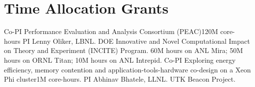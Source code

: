 \section{Time Allocation Grants}
		{Co-PI}
		{Performance Evaluation and Analysis Consortium (PEAC)}{}{120M core-hours}
		{PI Lenny Oliker, LBNL.  DOE 
		 Innovative and Novel Computational Impact on Theory and Experiment (INCITE)
		 Program.  60M hours on ANL Mira; 50M hours on ORNL Titan;
		 10M hours on ANL Intrepid.}
	{Co-PI}
	{Exploring energy efficiency, memory contention and application-tools-hardware
		co-design on a Xeon Phi cluster}{}{1M core-hours.
	PI Abhinav Bhatele, LLNL.  UTK Beacon Project.}{}
